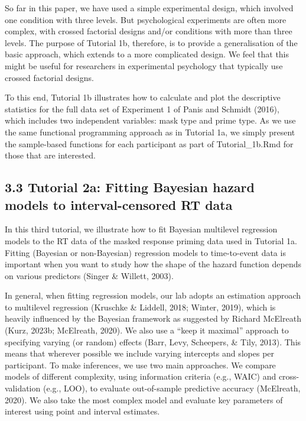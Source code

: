\documentclass[
  man, donotrepeattitle,floatsintext]{apa6}
\begin{document}
So far in this paper, we have used a simple experimental design, which involved one condition with three levels. But psychological experiments are often more complex, with crossed factorial designs and/or conditions with more than three levels. The purpose of Tutorial 1b, therefore, is to provide a generalisation of the basic approach, which extends to a more complicated design. We feel that this might be useful for researchers in experimental psychology that typically use crossed factorial designs.

To this end, Tutorial 1b illustrates how to calculate and plot the descriptive statistics for the full data set of Experiment 1 of Panis and Schmidt (2016), which includes two independent variables: mask type and prime type. As we use the same functional programming approach as in Tutorial 1a, we simply present the sample-based functions for each participant as part of Tutorial\_1b.Rmd for those that are interested.

\subsection{3.3 Tutorial 2a: Fitting Bayesian hazard models to interval-censored RT data}\label{tutorial-2a-fitting-bayesian-hazard-models-to-interval-censored-rt-data}

In this third tutorial, we illustrate how to fit Bayesian multilevel regression models to the RT data of the masked response priming data used in Tutorial 1a. Fitting (Bayesian or non-Bayesian) regression models to time-to-event data is important when you want to study how the shape of the hazard function depends on various predictors (Singer \& Willett, 2003).

In general, when fitting regression models, our lab adopts an estimation approach to multilevel regression (Kruschke \& Liddell, 2018; Winter, 2019), which is heavily influenced by the Bayesian framework as suggested by Richard McElreath (Kurz, 2023b; McElreath, 2020). We also use a ``keep it maximal'' approach to specifying varying (or random) effects (Barr, Levy, Scheepers, \& Tily, 2013). This means that wherever possible we include varying intercepts and slopes per participant.
To make inferences, we use two main approaches. We compare models of different complexity, using information criteria (e.g., WAIC) and cross-validation (e.g., LOO), to evaluate out-of-sample predictive accuracy (McElreath, 2020). We also take the most complex model and evaluate key parameters of interest using point and interval estimates.
\end{document}
